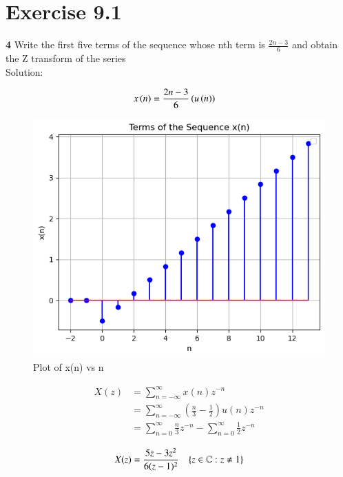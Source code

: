 \documentclass[journal,12pt,twocolumn]{IEEEtran}
\theoremstyle{remark}
\begin{document}


\vspace{3cm}

\title{}
\author{EE23BTECH11047 - Deepakreddy P
}
\maketitle
\newpage
\bigskip

\section*{Exercise 9.1}

\noindent \textbf{4} \hspace{2pt} Write the first five terms of the sequence whose nth term is $\frac{2n-3}{6}$ and obtain the Z transform of the series\\
\noindent Solution:

\begin{align}
x \left(n\right) &= \frac{2n-3}{6} \left(u\left(n\right)\right)
\label{x(n)}
\end{align}

\begin{figure}[h]
   \centering
   \includegraphics[width=1\columnwidth]{figs/plot.png}
   \caption{Plot of x(n) vs n}
   \label{fig: 9.1.4.1}
\end{figure}

\begin{align}
X(z) &= \sum_{n = -\infty}^{\infty} x(n) z^{-n} \\
 &= \sum_{n = -\infty}^{\infty} (\frac{n}{3} - \frac{1}{2})  u(n)  z^{-n} \\
 &= \sum_{n=0}^{\infty} \frac{n}{3}  z^{-n} - \sum_{n=0}^{\infty} \frac{1}{2}  z^{-n} 
\end{align}

\begin{align}
X(z) &= {\frac{5z-3 z^{2}}{6(z-1)^{2}}}&\left\{z\in\mathbb{C} : z \neq 1\right\} 
\end{align}
\newpage

\end{document}
